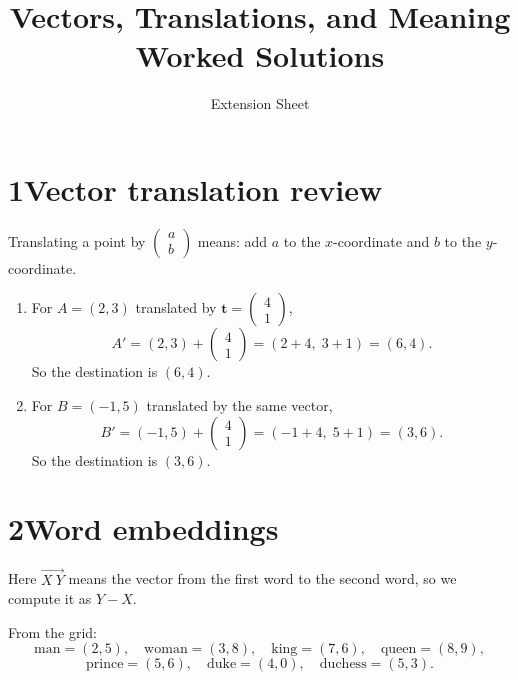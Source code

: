 \documentclass[12pt]{ctexart}
\title{Vectors, Translations, and Meaning\\[2pt] \large Worked Solutions}
\author{Extension Sheet}
\date{}
\newcommand{\overarrow}[1]{\overrightarrow{#1}}
\newcommand{\colvec}[2]{\begin{pmatrix} #1 \\ #2 \end{pmatrix}}
\begin{document}
\maketitle

\section*{1\quad Vector translation review}

Translating a point by \(\colvec{a}{b}\) means: add \(a\) to the \(x\)-coordinate and \(b\) to the \(y\)-coordinate.

\begin{enumerate}[label=\textbf{\arabic*.}]
\item For \(A=(2,3)\) translated by \(\mathbf{t}=\colvec{4}{1}\),
\[
A'=(2,3)+\colvec{4}{1}
=(2+4,\;3+1)
=(6,4).
\]
So the destination is \(\boxed{(6,4)}\).

\item For \(B=(-1,5)\) translated by the same vector,
\[
B'=(-1,5)+\colvec{4}{1}
=(-1+4,\;5+1)
=(3,6).
\]
So the destination is \(\boxed{(3,6)}\).
\end{enumerate}

\section*{2\quad Word embeddings}

Here \(\overarrow{X\ Y}\) means the vector from the first word to the second word, so we compute it as \(Y-X\).

From the grid:
\[
\text{man}=(2,5),\quad
\text{woman}=(3,8),\quad
\text{king}=(7,6),\quad
\text{queen}=(8,9),
\]
\[
\text{prince}=(5,6),\quad
\text{duke}=(4,0),\quad
\text{duchess}=(5,3).
\]
\end{document}
